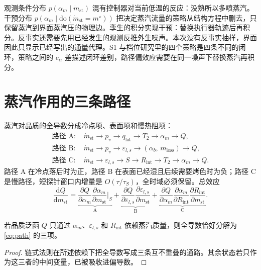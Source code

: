 观测条件分布 \(p(\alpha_m\mid \dot m_{\mathrm{st}})\) 混有控制器对当前低温的反应：没熟所以多喷蒸汽。干预分布 \(p(\alpha_m\mid\mathrm{do}(\dot m_{\mathrm{st}}=m^\star))\) 把决定蒸汽流量的策略从结构方程中删去，只保留蒸汽到界面蒸汽压的物理边\cite{pearl2009}。孪生的积分实现干预：替换执行器轨迹后再积分。反事实还需要先用已经发生的观测反推外生噪声。本次没有反事实抽样，界面因此只显示已经写出的通量代理。S1 与档位研究里的四个策略是四条不同的闭环，策略之间的 \(e_{\alpha}\) 差描述闭环差别，路径偏效应需要在同一噪声下替换蒸汽再积分。

\section{蒸汽作用的三条路径}

蒸汽对品质的全导数分成冷点项、表面项和慢热阻项：
\begin{align}
\text{路径 A: }& \dot m_{\mathrm{st}}\to p_v\to q_{\mathrm{lat}}\to T_2\to\alpha_m\to Q,\\
\text{路径 B: }& \dot m_{\mathrm{st}}\to p_v\to\varepsilon_{l,s}\to(\alpha_b,\,m_{\mathrm{loss}})\to Q,\\
\text{路径 C: }& \dot m_{\mathrm{st}}\to\varepsilon_{l,s}\to S\to R_{\mathrm{int}}\to T_2\to\alpha_m\to Q.
\end{align}
路径 A 在冷点落后时为正，路径 B 在表面已经湿且后续需要烤色时为负；路径 C 是慢路径，短探针窗口内增量是 \(O(\tau/\tau_S)\)，全时域必须保留。总效应
\begin{equation}
\label{eq:path}
\frac{\mathrm{d}Q}{\mathrm{d}m_{\mathrm{st}}}
=\underbrace{\frac{\partial Q}{\partial\alpha_m}\frac{\partial\alpha_m}{\partial m_{\mathrm{st}}}\Big|_{\!S}}_{\text{A}}
+\underbrace{\frac{\partial Q}{\partial\varepsilon_{l,s}}\frac{\partial\varepsilon_{l,s}}{\partial m_{\mathrm{st}}}}_{\text{B}}
+\underbrace{\frac{\partial Q}{\partial\alpha_m}\frac{\partial\alpha_m}{\partial R_{\mathrm{int}}}\frac{\partial R_{\mathrm{int}}}{\partial m_{\mathrm{st}}}}_{\text{C}}.
\end{equation}

\begin{proposition}[路径加性]
若品质泛函 \(Q\) 只通过 \(\alpha_m\)、\(\varepsilon_{l,s}\) 和 \(R_{\mathrm{int}}\) 依赖蒸汽质量，则全导数恰好分解为\eqref{eq:path} 的三项。
\end{proposition}

\begin{proof}
链式法则在所述依赖下把全导数写成三条互不重叠的通路。其余状态若只作为这三者的中间变量，已被吸收进偏导数。
\end{proof}

